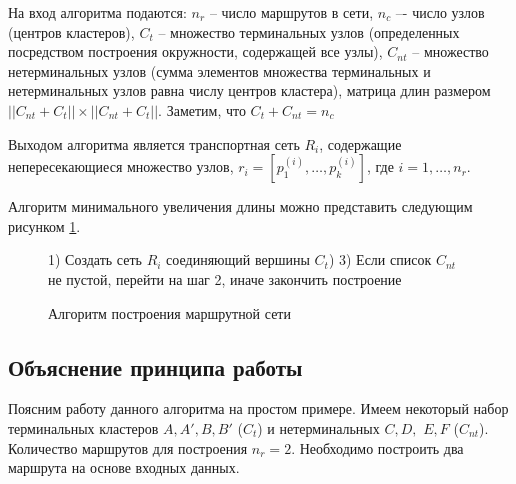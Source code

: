 На вход алгоритма подаются: \( n_r \) -- число маршрутов в сети, \( n_c \) –- число узлов (центров 
кластеров), \( C_t \) – множество терминальных узлов (определенных посредством построения окружности, 
содержащей все узлы), \( C_{nt} \) -- множество нетерминальных узлов (сумма элементов множества терминальных 
и нетерминальных узлов равна числу центров кластера), матрица длин размером 
\( ||{C_{nt}} + {C_{t}}|| \times ||{C_{nt}} + {C_{t}}|| \). Заметим, что \( C_t + C_{nt} = n_c \)

Выходом алгоритма является транспортная сеть \( R_i \), содержащие непересекающиеся множество узлов, 
\( r_{i} = [p_{1}^{(i)}, \dots, p_{k}^{(i)}] \), где \( i = 1, \dots, n_r \). 

Алгоритм минимального увеличения длины можно представить следующим рисунком \ref{alg:min-length}.
\begin{figure}[ht!]
    \begin{algorithm}[H]
        1) Создать сеть \( R_i \) соединяющий вершины \( C_t \)) 
        3) Если список \( C_{nt} \) не пустой, перейти на шаг 2, иначе закончить построение\;
    \end{algorithm}
    \vspace*{-1.5em}
    \caption{Алгоритм построения маршрутной сети}
    \label{alg:min-length}
\end{figure}

\subsection{Объяснение принципа работы}
Поясним работу данного алгоритма на простом примере. Имеем некоторый набор терминальных кластеров 
\( A, A', B, B' \) (\( C_t \)) и нетерминальных \( C, D, \) \( E, F \) (\( C_{nt} \)). Количество маршрутов 
для построения \( n_r = 2 \). Необходимо построить два маршрута на основе входных данных.


